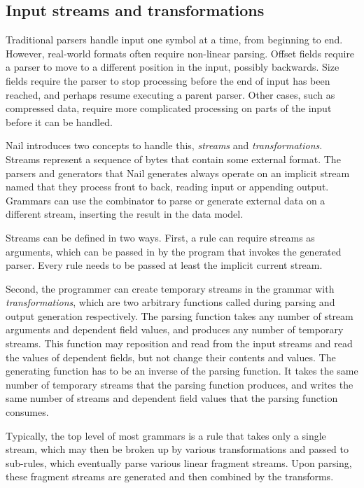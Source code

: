 \subsection{Input streams and transformations}
\label{s:transforms}

Traditional parsers handle input one symbol at a time, from beginning to end.
However, real-world formats often require non-linear parsing. Offset fields require a parser to move
to a different position in the input, possibly backwards. Size fields require the parser to stop
processing before the end of input has been reached, and perhaps resume executing a parent parser.
Other cases, such as compressed data, require more complicated processing on parts of the input
before it can be handled.

Nail introduces two concepts to handle this, \emph{streams} and \emph{transformations}. 
Streams represent a sequence of bytes that contain some external format. The parsers and generators
that Nail generates always operate on an implicit stream named  that they process front to
back, reading input or appending output.
Grammars can use the  combinator to parse or generate external data on a different stream,
inserting the result in the data model.

Streams can be defined in two ways.
First, a rule can require streams as arguments, which can be passed in by the program that invokes
the generated parser. Every rule needs to be passed at least the implicit current stream.

Second, the programmer can create temporary streams in the grammar with \emph{transformations},
which are two arbitrary functions called during parsing and output generation respectively.
The parsing function  takes any number of stream arguments and dependent field values,
and produces any number of temporary streams. This function may reposition and read from the
input streams and read the values of dependent fields, but not change their contents and values. 
The generating function has to be an inverse of the parsing function. It takes the same number of
temporary streams that the parsing function produces, and writes the same number of streams and
dependent field values that the parsing function consumes.

Typically, the top level of most grammars is a rule that takes only a single stream, which may then
be broken up by various transformations and passed to sub-rules, which eventually parse various linear
fragment streams. Upon parsing, these fragment streams are generated and then combined by the
transforms.

